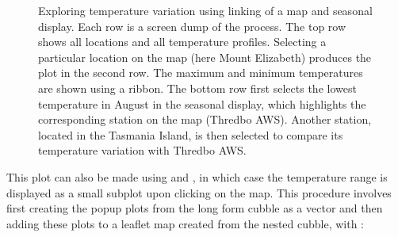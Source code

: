 \documentclass[
]{jss}
\newenvironment{Shaded}{\begin{snugshade}}{\end{snugshade}}
\newcommand{\AttributeTok}[1]{\textcolor[rgb]{0.77,0.63,0.00}{#1}}
\newcommand{\CommentTok}[1]{\textcolor[rgb]{0.56,0.35,0.01}{\textit{#1}}}
\newcommand{\ControlFlowTok}[1]{\textcolor[rgb]{0.13,0.29,0.53}{\textbf{#1}}}
\newcommand{\DecValTok}[1]{\textcolor[rgb]{0.00,0.00,0.81}{#1}}
\newcommand{\ErrorTok}[1]{\textcolor[rgb]{0.64,0.00,0.00}{\textbf{#1}}}
\newcommand{\FunctionTok}[1]{\textcolor[rgb]{0.00,0.00,0.00}{#1}}
\newcommand{\NormalTok}[1]{#1}
\newcommand{\OtherTok}[1]{\textcolor[rgb]{0.56,0.35,0.01}{#1}}
\newcommand{\SpecialCharTok}[1]{\textcolor[rgb]{0.00,0.00,0.00}{#1}}
\newcommand{\StringTok}[1]{\textcolor[rgb]{0.31,0.60,0.02}{#1}}
\begin{document}
\begin{CodeChunk}
\begin{figure}
\caption[Exploring temperature variation using linking of a map and seasonal display]{Exploring temperature variation using linking of a map and seasonal display. Each row is a screen dump of the process. The top row shows all locations and all temperature profiles. Selecting a particular location on the map (here Mount Elizabeth) produces the plot in the second row. The maximum and minimum temperatures are shown using a ribbon. The bottom row first selects the lowest temperature in August in the seasonal display, which highlights the corresponding station on the map (Thredbo AWS). Another  station, located in the Tasmania Island, is then selected to compare its temperature variation with Thredbo AWS.}\label{fig:interactive-linking}
\end{figure}
\end{CodeChunk}

This plot can also be made using  and , in which case the temperature range is displayed as a small subplot upon clicking on the map. This procedure involves first creating the popup plots from the long form cubble as a vector and then adding these plots to a leaflet map created from the nested cubble, with :

\begin{Shaded}
\end{Shaded}
\end{document}
